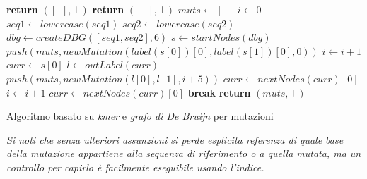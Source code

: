 \documentclass[a4paper,12pt, oneside]{book}
\begin{document}
\begin{algorithm}[H]
  \small
  \begin{algorithmic}[1]
    \State \textbf{return} $([\,\,\,],\bot)$
    \EndIf
    \State \textbf{return} $([\,\,\,],\bot)$
    \EndIf
    \State $muts \gets [\,\,\,]$
    \State $i\gets 0$
    \State $seq1\gets lowercase(seq1)$
    \State $seq2\gets lowercase(seq2)$
    \State $dbg\gets createDBG([seq1, seq2], 6)$
    \State $s \gets startNodes(dbg)$
    \State $push(muts, newMutation(label(s[0])[0], label(s[1])[0], 0))$ 
    \State $i\gets i+1$
    \EndIf
    \State $curr\gets s[0]$
    \While {$\top$}
    \State $l\gets outLabel(curr)$
    \State $push(muts, newMutation(l[0],l[1], i+5))$
    \State $curr\gets nextNodes(curr)[0]$
    \Else
    \State $i\gets i+1$
    \State $curr\gets nextNodes(curr)[0]$
    \EndIf
    \State \textbf{break}
    \EndIf
    \EndWhile
    \State \textbf{return} $(muts, \top)$
    \EndFunction
  \end{algorithmic}
  \caption{Algoritmo basato su \textit{kmer} e \textit{grafo di De Bruijn} per
  mutazioni} 
\end{algorithm}
\textit{Si noti che senza ulteriori assunzioni si perde esplicita referenza di
quale base della mutazione appartiene alla sequenza di riferimento o a quella
mutata, ma un controllo per capirlo è facilmente eseguibile usando l'indice.}\\
\end{document}
